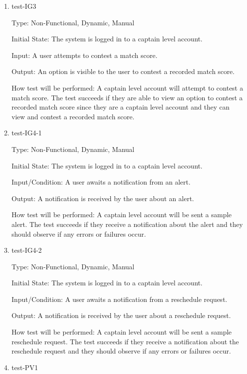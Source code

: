 \documentclass[12pt, titlepage]{article}
\begin{document}
\begin{enumerate}
  \item{test-IG3\\}

  Type: Non-Functional, Dynamic, Manual

  Initial State: The system is logged in to a captain level account.

  Input: A user attempts to contest a match score.

  Output: An option is visible to the user to contest a recorded match score.

  How test will be performed: A captain level account will attempt to
  contest a match score. The test succeeds if they are able to view an option to contest
  a recorded match score since they are a captain level account and they can view and contest
  a recorded match score.

  \item{test-IG4-1\\}

  Type: Non-Functional, Dynamic, Manual

  Initial State: The system is logged in to a captain level account.

  Input/Condition: A user awaits a notification from an alert.

  Output: A notification is received by the user about an alert.

  How test will be performed: A captain level account will be sent a sample alert. The test
  succeeds if they receive a notification about the alert and they should observe if any
  errors or failures occur.

  \item{test-IG4-2\\}

  Type: Non-Functional, Dynamic, Manual

  Initial State: The system is logged in to a captain level account.

  Input/Condition: A user awaits a notification from a reschedule request.

  Output: A notification is received by the user about a reschedule request.

  How test will be performed: A captain level account will be sent a sample reschedule request.
  The test succeeds if they receive a notification about the reschedule request and they
  should observe if any errors or failures occur.

  \item{test-PV1\\}


\end{enumerate}
\end{document}
